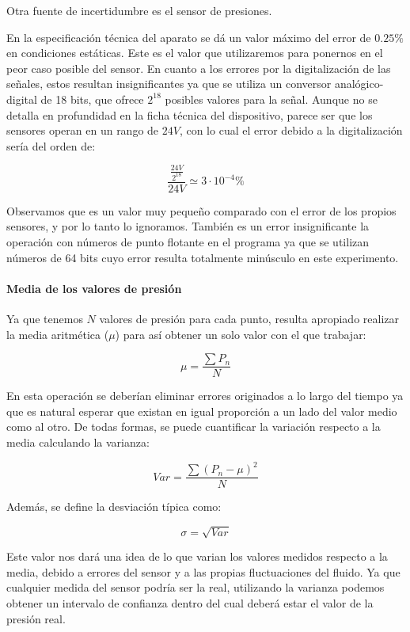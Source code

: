 \documentclass{article}
\begin{document}
Otra fuente de incertidumbre es el sensor de presiones.

En la especificación técnica del aparato se dá un valor máximo del error de $0.25\%$ en condiciones estáticas. Este es el valor 
que utilizaremos para ponernos en el peor caso posible del sensor. 
En cuanto a los errores por la digitalización de las señales, 
estos resultan insignificantes ya que se utiliza un conversor analógico-digital de 18 bits, que ofrece $2^18$ posibles valores 
para la señal. Aunque no se detalla en profundidad en la ficha técnica del dispositivo, parece ser que los sensores operan 
en un rango de $24V$, con lo cual el error debido a la digitalización sería del orden de:

$$\frac{\frac{24V}{2^{18}}}{24V} \simeq 3 \cdot 10^{-4}\%$$

Observamos que es un valor muy pequeño comparado con el error de los propios sensores, y por lo tanto lo ignoramos. También
es un error insignificante la operación con números de punto flotante en el programa ya que se utilizan números de 64 bits 
cuyo error resulta totalmente minúsculo en este experimento.


\paragraph{Media de los valores de presión}

Ya que tenemos $N$ valores de presión para cada punto, resulta apropiado realizar la media aritmética ($\mu$) para así obtener 
un solo valor con el que trabajar:

$$\mu = \frac{\sum P_n}{N}$$

En esta operación se deberían eliminar errores originados a lo largo del tiempo ya que 
es natural esperar que existan en igual proporción a un lado del valor medio como al otro. De todas formas, se puede cuantificar 
la variación respecto a la media calculando la varianza:

$$Var = \frac{\sum (P_n - \mu)^2}{N}$$

Además, se define la desviación típica como:

$$\sigma = \sqrt{Var}$$

Este valor nos dará una idea de lo que varian los valores medidos respecto a la media, debido a errores del sensor y a 
las propias fluctuaciones del fluido. Ya que cualquier medida del sensor podría ser la real, utilizando la varianza podemos 
obtener un intervalo de confianza dentro del cual deberá estar el valor de la presión real.
\end{document}
